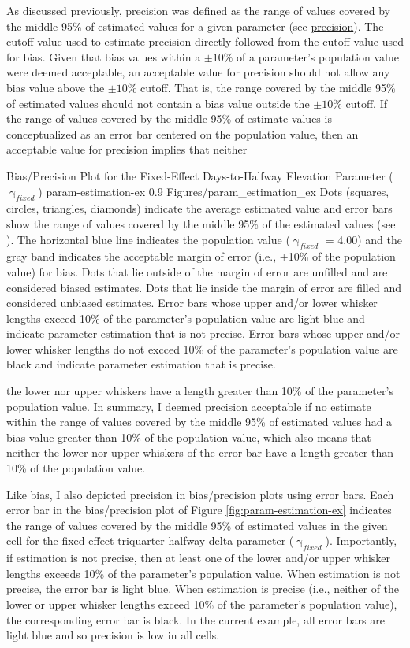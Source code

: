 \documentclass[
12pt, %
twoside,
english]{guelphthesis}
\begin{document}
As discussed previously, precision was defined as the range of values covered by the middle 95\% of estimated values for a given parameter (see \protect\hyperlink{precision-mid-ext-exp1}{precision}). The cutoff value used to estimate precision directly followed from the cutoff value used for bias. Given that bias values within a \(\pm10\%\) of a parameter's population value were deemed acceptable, an acceptable value for precision should not allow any bias value above the \(\pm10\%\) cutoff. That is, the range covered by the middle 95\% of estimated values should not contain a bias value outside the \(\pm10\%\) cutoff. If the range of values covered by the middle 95\% of estimate values is conceptualized as an error bar centered on the population value, then an acceptable value for precision implies that neither
\begin{apaFigure}
[portrait]
[0cm]
{Bias/Precision Plot for the Fixed-Effect Days-to-Halfway Elevation Parameter ($\upgamma_{fixed}$)}
{param-estimation-ex}
{0.9}
{Figures/param_estimation_ex}
{Dots (squares, circles, triangles, diamonds) indicate the average estimated value and error bars show the range of values covered by the middle 95\% of the estimated values (see ). The horizontal blue line indicates the population value ($\upgamma_{fixed}$ = 4.00) and the gray band indicates the acceptable margin of error (i.e., $\pm$10\% of the population value) for bias. Dots that lie outside of the margin of error are unfilled and are considered biased estimates. Dots that lie inside the margin of error are filled and considered unbiased estimates. Error bars whose upper and/or lower whisker lengths exceed 10\% of the parameter's population value are light blue and indicate parameter estimation that is not precise. Error bars whose upper and/or lower whisker lengths do not excced 10\% of the parameter's population value are black and indicate parameter estimation that is precise.}
\end{apaFigure}
\noindent the lower nor upper whiskers have a length greater than 10\% of the parameter's population value. In summary, I deemed precision acceptable if no estimate within the range of values covered by the middle 95\% of estimated values had a bias value greater than 10\% of the population value, which also means that neither the lower nor upper whiskers of the error bar have a length greater than 10\% of the population value.

Like bias, I also depicted precision in bias/precision plots using error bars. Each error bar in the bias/precision plot of Figure \ref{fig:param-estimation-ex} indicates the range of values covered by the middle 95\% of estimated values in the given cell for the fixed-effect triquarter-halfway delta parameter (\(\upgamma_{fixed}\)). Importantly, if estimation is not precise, then at least one of the lower and/or upper whisker lengths exceeds 10\% of the parameter's population value. When estimation is not precise, the error bar is light blue. When estimation is precise (i.e., neither of the lower or upper whisker lengths exceed 10\% of the parameter's population value), the corresponding error bar is black. In the current example, all error bars are light blue and so precision is low in all cells.
\end{document}
